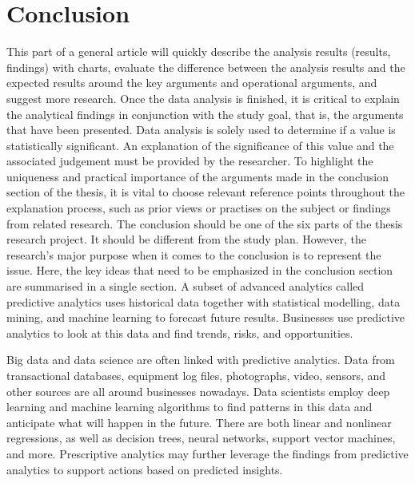 \documentclass[journal]{IEEEtran}
\begin{document}
\section{Conclusion }  
\par This part of a general article will quickly describe the analysis results (results, findings) with charts, evaluate the difference between the analysis results and the expected results around the key arguments and operational arguments, and suggest more research. Once the data analysis is finished, it is critical to explain the analytical findings in conjunction with the study goal, that is, the arguments that have been presented. Data analysis is solely used to determine if a value is statistically significant. An explanation of the significance of this value and the associated judgement must be provided by the researcher. To highlight the uniqueness and practical importance of the arguments made in the conclusion section of the thesis, it is vital to choose relevant reference points throughout the explanation process, such as prior views or practises on the subject or findings from related research. The conclusion should be one of the six parts of the thesis research project. It should be different from the study plan. However, the research's major purpose when it comes to the conclusion is to represent the issue. Here, the key ideas that need to be emphasized in the conclusion section are summarised in a single section. A subset of advanced analytics called predictive analytics uses historical data together with statistical modelling, data mining, and machine learning to forecast future results. Businesses use predictive analytics to look at this data and find trends, risks, and opportunities.

\par Big data and data science are often linked with predictive analytics. Data from transactional databases, equipment log files, photographs, video, sensors, and other sources are all around businesses nowadays. Data scientists employ deep learning and machine learning algorithms to find patterns in this data and anticipate what will happen in the future. There are both linear and nonlinear regressions, as well as decision trees, neural networks, support vector machines, and more. Prescriptive analytics may further leverage the findings from predictive analytics to support actions based on predicted insights.
\end{document}
